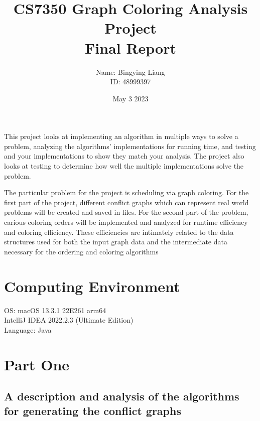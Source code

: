 \documentclass{article}
\title{CS7350 Graph Coloring Analysis Project \\Final Report
}
\author{
Name: Bingying Liang \\  ID: 48999397}
\date{May 3 2023}
\begin{document}
\maketitle
This project looks at implementing an algorithm in multiple ways to solve a problem, analyzing the algorithms’
implementations for running time, and testing and your implementations to show they match your analysis. The
project also looks at testing to determine how well the multiple implementations solve the problem.

The particular problem for the project is scheduling via graph coloring. For the first part of the project, different conflict graphs which can represent real world problems will be created and saved in files. For the second part of the problem, carious coloring orders will be implemented and analyzed for runtime efficiency and coloring efficiency. These efficiencies are intimately related to the data structures used for both the input graph data and the intermediate
data necessary for the ordering and coloring algorithms
\section{Computing Environment}
     OS: macOS 13.3.1 22E261 arm64 \\
     IntelliJ IDEA 2022.2.3 (Ultimate Edition)\\
     Language: Java
\section{Part One}
\subsection{A description and analysis of the algorithms for generating the conflict graphs}
\end{document}
